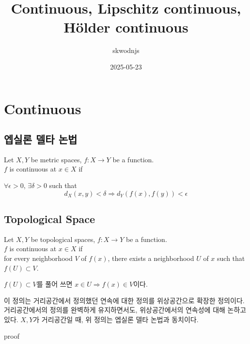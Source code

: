 \documentclass[11pt]{article}
\renewcommand{\(}{\left(}
\renewcommand{\)}{\right)}
\renewcommand{\[}{\left[}
\renewcommand{\]}{\right]}
\newcommand{\tags}[1]{#1}
\newenvironment{text-box}{}{}
\newcommand{\subheading}[1]{#1}
\begin{document}
\title{Continuous, Lipschitz continuous, Hölder continuous}
\date{2025-05-23}
\tags{}
\author{skwodnjs}

\maketitle

\section{Continuous}

\subsection{엡실론 델타 논법}

Let $X, Y$ be metric spaces, $f: X \to Y$ be a function. \\
$f$ is continuous at $x \in X$ if \\
\begin{text-box}
    $\forall \epsilon > 0$, $\exists \delta > 0$ such that
    \begin{equation}
        d_X(x, y) < \delta \Rightarrow d_Y(f(x), f(y)) < \epsilon
    \end{equation}
\end{text-box}

\subsection{Topological Space}

Let $X, Y$ be topological spaces, $f: X \to Y$ be a function. \\
$f$ is continuous at $x \in X$ if \\
for every neighborhood $V$ of $f(x)$, there exists a neighborhood $U$ of $x$ 
such that $f(U) \subset V$.

$f(U) \subset V$를 풀어 쓰면 $x \in U \Rightarrow f(x) \in V$이다.

이 정의는 거리공간에서 정의했던 연속에 대한 정의를 위상공간으로 확장한 정의이다. 
거리공간에서의 정의를 완벽하게 유지하면서도, 위상공간에서의 연속성에 대해 논하고 있다. 
$X, Y$가 거리공간일 때, 위 정의는 엡실론 델타 논법과 동치이다.

\subheading{proof}
\end{document}
